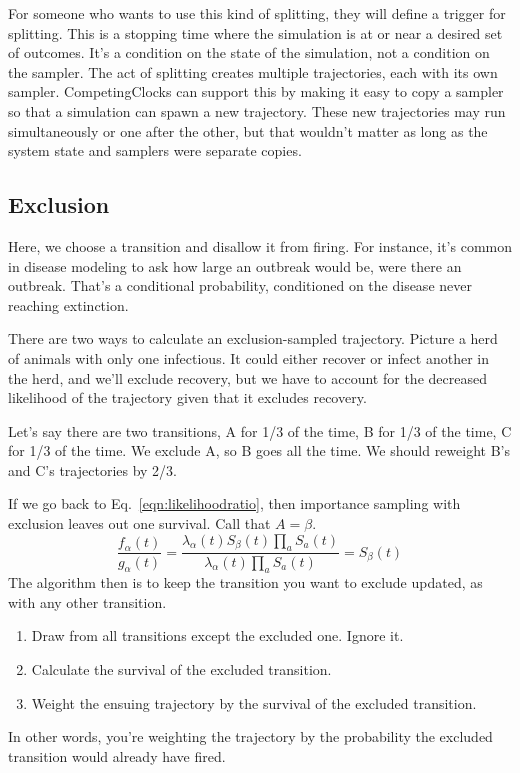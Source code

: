 \documentclass{article}
\begin{document}
For someone who wants to use this kind of splitting, they will define a trigger for splitting. This is a stopping time where the simulation is at or near a desired set of outcomes. It's a condition on the state of the simulation, not a condition on the sampler. The act of splitting creates multiple trajectories, each with its own sampler. CompetingClocks can support this by making it easy to copy a sampler so that a simulation can spawn a new trajectory. These new trajectories may run simultaneously or one after the other, but that wouldn't matter as long as the system state and samplers were separate copies.


\subsection{Exclusion}

Here, we choose a transition and disallow it from firing. For instance, it's common in disease modeling to ask how large an outbreak would be, were there an outbreak. That's a conditional probability, conditioned on the disease never reaching extinction. 

There are two ways to calculate an exclusion-sampled trajectory. Picture a herd of animals with only one infectious. It could either recover or infect another in the herd, and we'll exclude recovery, but we have to account for the decreased likelihood of the trajectory given that it excludes recovery.

Let's say there are two transitions, A for 1/3 of the time, B for 1/3 of the time, C for 1/3 of the time. We exclude A, so B goes all the time. We should reweight B's and C's trajectories by 2/3.

If we go back to Eq.~\ref{eqn:likelihoodratio}, then importance sampling with exclusion leaves out one survival. Call that $A=\beta$.
\begin{equation}
	\frac{f_\alpha(t)}{g_\alpha(t)} = \frac{\lambda_{\alpha}(t)S_\beta(t)\prod_{a}S_a(t)}{\lambda_{\alpha}(t)\prod_{a}S_a(t)} = S_\beta(t)
\end{equation}
The algorithm then is to keep the transition you want to exclude updated, as with any other transition.
\begin{enumerate}
	\item Draw from all transitions except the excluded one. Ignore it.
	\item Calculate the survival of the excluded transition.
	\item Weight the ensuing trajectory by the survival of the excluded transition.
\end{enumerate}
In other words, you're weighting the trajectory by the probability the excluded transition would already have fired.
\end{document}
